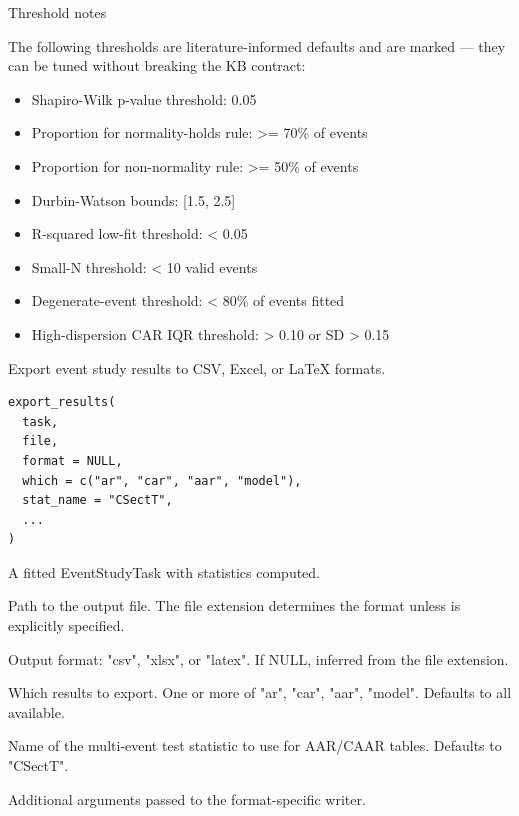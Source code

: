 \documentclass[a4paper]{book}
\begin{document}
\begin{Section}{Threshold notes}

The following thresholds are literature-informed defaults and are marked
\strong{[ASSUMED]} — they can be tuned without breaking the KB contract:
\begin{itemize}

\item{} Shapiro-Wilk p-value threshold: 0.05
\item{} Proportion for normality-holds rule: \bsl{}>= 70\% of events
\item{} Proportion for non-normality rule: \bsl{}>= 50\% of events
\item{} Durbin-Watson bounds: [1.5, 2.5]
\item{} R-squared low-fit threshold: < 0.05
\item{} Small-N threshold: < 10 valid events
\item{} Degenerate-event threshold: < 80\% of events fitted
\item{} High-dispersion CAR IQR threshold: > 0.10 or SD > 0.15

\end{itemize}

\end{Section}
%
\begin{Description}
Export event study results to CSV, Excel, or LaTeX formats.
\end{Description}
%
\begin{Usage}
\begin{verbatim}
export_results(
  task,
  file,
  format = NULL,
  which = c("ar", "car", "aar", "model"),
  stat_name = "CSectT",
  ...
)
\end{verbatim}
\end{Usage}
%
\begin{Arguments}
\begin{ldescription}
\item[\code{task}] A fitted EventStudyTask with statistics computed.

\item[\code{file}] Path to the output file. The file extension determines the format
unless  is explicitly specified.

\item[\code{format}] Output format: "csv", "xlsx", or "latex". If NULL, inferred
from the file extension.

\item[\code{which}] Which results to export. One or more of "ar", "car", "aar",
"model". Defaults to all available.

\item[\code{stat\_name}] Name of the multi-event test statistic to use for AAR/CAAR
tables. Defaults to "CSectT".

\item[\code{...}] Additional arguments passed to the format-specific writer.
\end{ldescription}
\end{Arguments}
\end{document}
